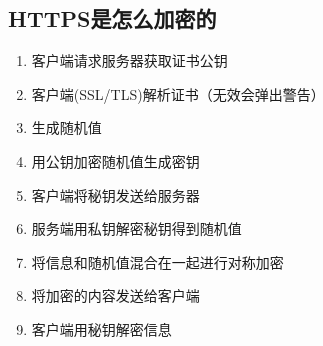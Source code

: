 \documentclass[../../../interview-questions.tex]{subfiles}
\begin{document}
\subsection{HTTPS是怎么加密的}

\begin{enumerate}
    \item {客户端请求服务器获取证书公钥}
    \item {客户端(SSL/TLS)解析证书（无效会弹出警告）}
    \item {生成随机值}
    \item {用公钥加密随机值生成密钥}
    \item {客户端将秘钥发送给服务器}
    \item {服务端用私钥解密秘钥得到随机值}
    \item {将信息和随机值混合在一起进行对称加密}
    \item {将加密的内容发送给客户端}
    \item {客户端用秘钥解密信息}
\end{enumerate}
\end{document}
